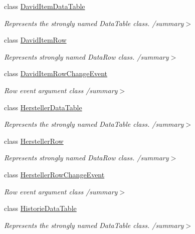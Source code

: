 \begin{DoxyCompactItemize}
class \hyperlink{class_products_1_1_data_1_1ds_sage_1_1_david_item_data_table}{David\+Item\+Data\+Table}
\begin{DoxyCompactList}\small\item\em Represents the strongly named Data\+Table class. /summary$>$ \end{DoxyCompactList}\item 
class \hyperlink{class_products_1_1_data_1_1ds_sage_1_1_david_item_row}{David\+Item\+Row}
\begin{DoxyCompactList}\small\item\em Represents strongly named Data\+Row class. /summary$>$ \end{DoxyCompactList}\item 
class \hyperlink{class_products_1_1_data_1_1ds_sage_1_1_david_item_row_change_event}{David\+Item\+Row\+Change\+Event}
\begin{DoxyCompactList}\small\item\em Row event argument class /summary$>$ \end{DoxyCompactList}\item 
class \hyperlink{class_products_1_1_data_1_1ds_sage_1_1_hersteller_data_table}{Hersteller\+Data\+Table}
\begin{DoxyCompactList}\small\item\em Represents the strongly named Data\+Table class. /summary$>$ \end{DoxyCompactList}\item 
class \hyperlink{class_products_1_1_data_1_1ds_sage_1_1_hersteller_row}{Hersteller\+Row}
\begin{DoxyCompactList}\small\item\em Represents strongly named Data\+Row class. /summary$>$ \end{DoxyCompactList}\item 
class \hyperlink{class_products_1_1_data_1_1ds_sage_1_1_hersteller_row_change_event}{Hersteller\+Row\+Change\+Event}
\begin{DoxyCompactList}\small\item\em Row event argument class /summary$>$ \end{DoxyCompactList}\item 
class \hyperlink{class_products_1_1_data_1_1ds_sage_1_1_historie_data_table}{Historie\+Data\+Table}
\begin{DoxyCompactList}\small\item\em Represents the strongly named Data\+Table class. /summary$>$ \end{DoxyCompactList}\item 

\end{DoxyCompactItemize}
